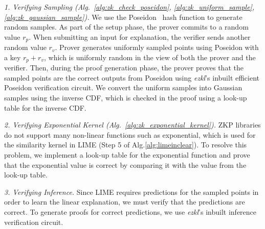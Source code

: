

\textit{1. Verifying Sampling (Alg.~\ref{alg:zk_check_poseidon}, \ref{alg:zk_uniform_sample}, \ref{alg:zk_gaussian_sample}).} We use the Poseidon~\cite{poseidon} hash function to generate random samples. As part of the setup phase, the prover commits to a random value $r_p$. When submitting an input for explanation, the
verifier sends another random value $r_v$. Prover generates uniformly sampled points using Poseidon with
a key $r_p + r_v$, which is uniformly random in the view of both the prover and the verifier. Then, during the proof generation phase, the prover proves that the sampled points are the correct outputs from Poseidon using \textit{ezkl}'s inbuilt efficient Poseidon verification circuit. We convert the uniform samples into Gaussian
samples using the inverse CDF, which is checked in the proof using a look-up table for the inverse CDF.

\textit{2. Verifying Exponential Kernel (Alg.~\ref{alg:zk_exponential_kernel}).} ZKP libraries do not support many non-linear functions such as exponential, which is used for the similarity kernel in LIME (Step 5 of Alg.\ref{alg:limeinclear}). To resolve this problem, we implement a look-up table for the exponential function and prove that the exponential value is correct by comparing it with the value from the look-up table.

\textit{3. Verifying Inference.} Since LIME requires predictions for the sampled points in order to learn the linear explanation, we must verify that the predictions are correct. To generate proofs for correct predictions, we use \textit{ezkl}'s inbuilt inference verification circuit. %

